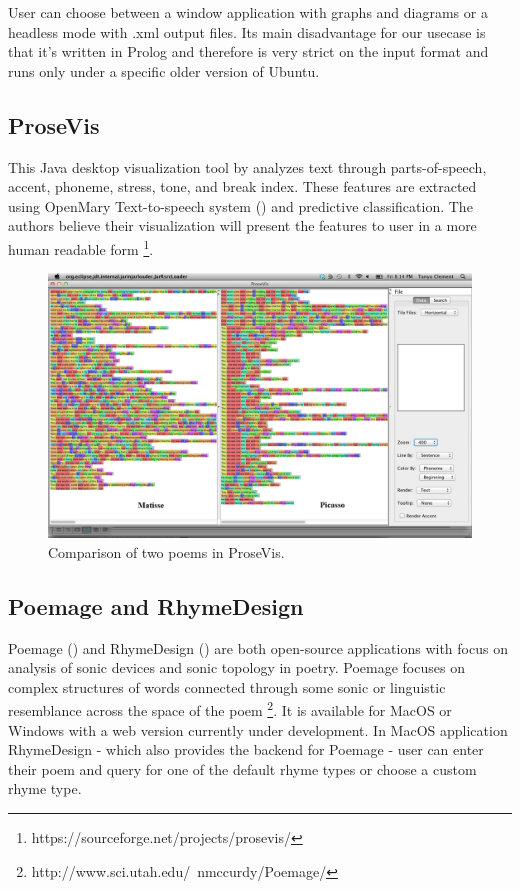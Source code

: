 User can choose between a window application with graphs and diagrams or a headless mode with .xml output files. Its main disadvantage for our usecase is that it's written in Prolog and therefore is very strict on the input format and runs only under a specific older version of Ubuntu. 

\subsection{ProseVis}
This Java desktop visualization tool by \cite{Clement2013} analyzes text through
parts-of-speech, accent, phoneme, stress, tone, and break index. These features are extracted using OpenMary Text-to-speech system (\cite{Schroder2006}) and predictive classification. The authors believe their visualization will present the features to user in a more human readable form \footnote{https://sourceforge.net/projects/prosevis/}.

\begin{figure}[h]\centering
	\includegraphics[scale=0.24]{../img/prosevis.png}
	\caption{Comparison of two poems in ProseVis.}\label{screenshotProsevis}
\end{figure}

\subsection{Poemage and RhymeDesign}
Poemage (\cite{McCurdy2015poemage}) and RhymeDesign (\cite{McCurdy2015}) are both open-source applications with focus on analysis of sonic devices and sonic topology in poetry. Poemage focuses on complex structures of words connected through some sonic or linguistic resemblance across the space of the poem \footnote{http://www.sci.utah.edu/~nmccurdy/Poemage/}. It is available for MacOS or Windows with a web version currently under development. In MacOS application RhymeDesign - which also provides the backend for Poemage - user can enter their poem and query for one of the default rhyme types or choose a custom rhyme type.

